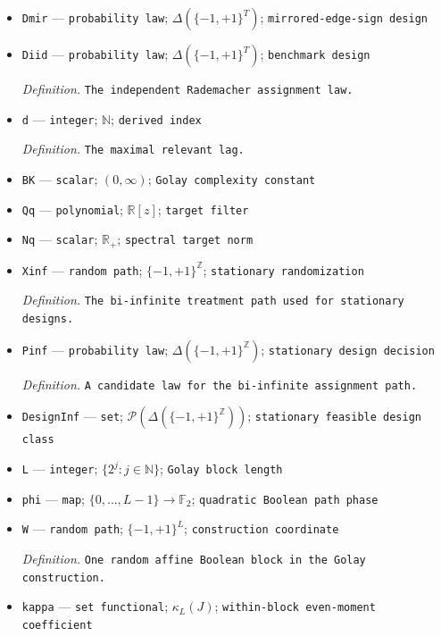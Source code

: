 \documentclass{article}
\begin{document}
\begin{itemize}
  \par\smallskip\noindent\emph{Definition.} The edge-sign path \(Z_t=X_tX_{t+1}\).
  \item \texttt{Dmir} --- \texttt{probability law}; \(\Delta(\{-1,+1\}^T)\); \texttt{mirrored-\allowbreak{}edge-\allowbreak{}sign design}
  \item \texttt{Diid} --- \texttt{probability law}; \(\Delta(\{-1,+1\}^T)\); \texttt{benchmark design}
  \par\smallskip\noindent\emph{Definition.} \texttt{The independent Rademacher assignment law.}
  \item \texttt{d} --- \texttt{integer}; \(\mathbb N\); \texttt{derived index}
  \par\smallskip\noindent\emph{Definition.} \texttt{The maximal relevant lag.}
  \item \texttt{BK} --- \texttt{scalar}; \((0,\infty)\); \texttt{Golay complexity constant}
  \item \texttt{Qq} --- \texttt{polynomial}; \(\mathbb R[z]\); \texttt{target filter}
  \item \texttt{Nq} --- \texttt{scalar}; \(\mathbb R_+\); \texttt{spectral target norm}
  \item \texttt{Xinf} --- \texttt{random path}; \(\{-1,+1\}^{\mathbb Z}\); \texttt{stationary randomization}
  \par\smallskip\noindent\emph{Definition.} \texttt{The bi-\allowbreak{}infinite treatment path used for stationary designs.}
  \item \texttt{Pinf} --- \texttt{probability law}; \(\Delta(\{-1,+1\}^{\mathbb Z})\); \texttt{stationary design decision}
  \par\smallskip\noindent\emph{Definition.} \texttt{A candidate law for the bi-\allowbreak{}infinite assignment path.}
  \item \texttt{DesignInf} --- \texttt{set}; \(\mathcal P(\Delta(\{-1,+1\}^{\mathbb Z}))\); \texttt{stationary feasible design class}
  \item \texttt{L} --- \texttt{integer}; \(\{2^j:j\in\mathbb N\}\); \texttt{Golay block length}
  \item \texttt{phi} --- \texttt{map}; \(\{0,\ldots,L-1\}\to\mathbb F_2\); \texttt{quadratic Boolean path phase}
  \item \texttt{W} --- \texttt{random path}; \(\{-1,+1\}^L\); \texttt{construction coordinate}
  \par\smallskip\noindent\emph{Definition.} \texttt{One random affine Boolean block in the Golay construction.}
  \item \texttt{kappa} --- \texttt{set functional}; \(\kappa_L(J)\); \texttt{within-\allowbreak{}block even-\allowbreak{}moment coefficient}

\end{itemize}
\end{document}
